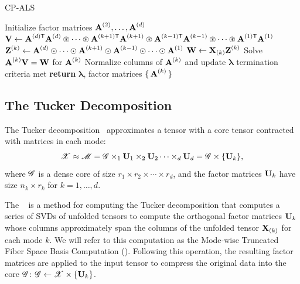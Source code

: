 \begin{algorithm}
  \caption{CP-ALS}
  \label{alg:cpals}
  \begin{algorithmic}[1]\footnotesize
    \State \label{line:cpals:init} Initialize factor matrices $\M{A}^{(2)}, \dots, \M{A}^{(d)}$
    \Repeat
      \State $\M{V} \gets \M{A}^{(d)\trans}\M{A}^{(d)} \circledast \dots \circledast \M{A}^{(k+1)\trans}\M{A}^{(k+1)} \circledast \M{A}^{(k-1)\trans}\M{A}^{(k-1)} \circledast \cdots \circledast \M{A}^{(1)\trans}\M{A}^{(1)}$\label{line:cpals:Gram}
      \State \label{line:cpals:KR} $\M{Z}^{(k)} \gets \M{A}^{(d)}\odot \cdots  \odot \M{A}^{(k+1)}\odot \M{A}^{(k-1)} \odot \cdots \odot \M{A}^{(1)}$
      \State \label{line:cpals:MTTKRP} $\M{W} \gets \M{X}_{(k)}\M{Z}^{(k)}$
      \State \label{line:cpals:solve} Solve $\M{A}^{(k)}\M{V} = \M{W}$ for $\M{A}^{(k)}$        
      \State Normalize columns of $\M{A}^{(k)}$ and update $\bm{\lambda}$
    \EndFor
    \Until termination criteria met
    \State \textbf{return} $\bm{\lambda}$, factor matrices $\set{\M{A}^{(k)}}$
    \EndFunction
  \end{algorithmic}
\end{algorithm}


\subsection{The Tucker Decomposition} \label{sec:hosvd} 
The Tucker decomposition~\cite{Tu66} approximates a tensor with a core tensor contracted with 
matrices in each mode:
\begin{displaymath}
  \T{X} \approx \T{M} = \T{G} \times_1 \Mn{U}{1} \times_2 \Mn{U}{2} \cdots \times_d \Mn{U}{d} = \T{G} \times \{\Mn{U}{k}\},
\end{displaymath}
where
$\T{G}$ is a dense core of size $r_1 \times r_2 \times \cdots \times r_d$, and the factor matrices 
$\Mn{U}{k}$ have size $n_k \times r_k$ for $k=1, \dots, d$.

The \hosvd~\cite{Lathauwer00amultilinear} is a method for computing the Tucker decomposition that computes a series 
of SVDs of
unfolded tensors to compute the orthogonal factor matrices $\Mn{U}{k}$ whose 
columns approximately span the columns of the unfolded tensor $\M{X}_{(k)}$ for each mode $k$. We will refer to this computation as the Mode-wise Truncated Fiber Space Basis Computation (\MTFSBC).
Following this operation, the resulting factor matrices are applied to the input tensor to compress the original data into the core $\T{G}$: $\T{G} \gets \T{X} \times \{ \Mn{U}{k} \}$. 

